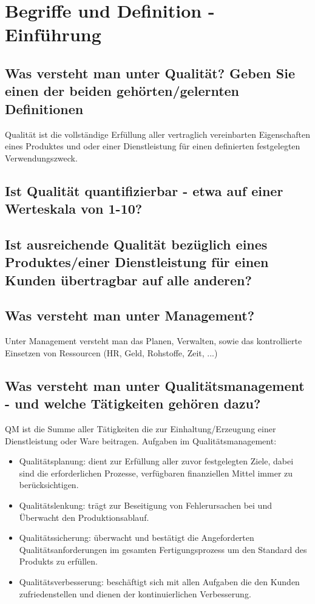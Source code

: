 
\section{Begriffe und Definition - Einführung}

	\subsection{Was versteht man unter Qualität? Geben Sie einen der beiden gehörten/gelernten Definitionen}
	
		Qualität ist die vollständige Erfüllung aller vertraglich vereinbarten Eigenschaften eines Produktes und oder einer Dienstleistung für einen definierten festgelegten Verwendungszweck.
	

	\subsection{Ist Qualität quantifizierbar - etwa auf einer Werteskala von 1-10?}

	\subsection{Ist ausreichende Qualität bezüglich eines Produktes/einer Dienstleistung für einen Kunden übertragbar auf alle anderen?}
	

	\subsection{Was versteht man unter Management?}
	
		Unter Management versteht man das Planen, Verwalten, sowie das kontrollierte Einsetzen von Ressourcen (HR, Geld, Rohstoffe, Zeit, ...)

	\subsection{Was versteht man unter Qualitätsmanagement - und welche Tätigkeiten gehören dazu?}
	QM ist die Summe aller Tätigkeiten die zur Einhaltung/Erzeugung einer Dienstleistung oder Ware beitragen.
	Aufgaben im Qualitätsmanagement:
	\begin{itemize}
		\item Qualitätsplanung:
			\subitem dient zur Erfüllung aller zuvor festgelegten Ziele, dabei sind die erforderlichen Prozesse, verfügbaren finanziellen Mittel immer zu berücksichtigen.
		\item Qualitätslenkung:
			\subitem trägt zur Beseitigung von Fehlerursachen bei und Überwacht den Produktionsablauf.
		\item Qualitätssicherung:
			\subitem überwacht und bestätigt die Angeforderten Qualitätsanforderungen im gesamten Fertigungsprozess um den Standard des Produkts zu erfüllen.
		\item Qualitätsverbesserung:
			\subitem beschäftigt sich mit allen Aufgaben die den Kunden zufriedenstellen und dienen der kontinuierlichen Verbesserung.
	\end{itemize}

